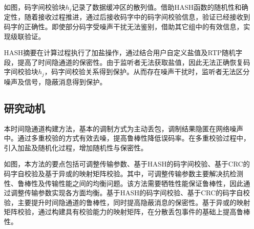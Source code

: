 如图，码字间校验块$h_{j}$记录了数据缓冲区的散列值。借助HASH函数的随机性和确定性，随着接收过程推进，通过后接收码字中的码字间校验信息，验证已经接收到码字的正确性。即使部分码字受噪声干扰无法鉴别，借助其它组中的有效信息，实现级联验证。

HASH摘要在计算过程执行了加盐操作，通过结合用户自定义盐值及RTP随机字段，提高了时间隐通道的保密性。由于监听者无法获取盐值，因此无法正确恢复码字间校验块$h_{j}$，码字间校验关系得到保护。从而存在噪声干扰时，监听者无法区分噪声及信号，隐蔽消息得到保护。

\subsection{研究动机}
\label{chap:hash:motivation:motivation}

本时间隐通道构建方法，基本的调制方式为主动丢包，调制结果隐匿在网络噪声中。通过多重校验的方式有效去噪，提高鲁棒性降低误码率。在多重校验过程中，引入加盐及随机化过程，增加随机性与保密性。


如图，本方法的要点包括可调整传输参数、基于HASH的码字间校验、基于CRC的码字自校验及基于异或的映射矩阵校验。其中，可调整传输参数主要解决抗检测性、鲁棒性及传输性能之间的均衡问题。该方法需要牺牲性能保证鲁棒性，因此通过调整传输参数实现各方面均衡。基于HASH的码字间校验、基于CRC的码字自校验，主要提升时间隐通道的鲁棒性，同时提高隐蔽消息的保密性。基于异或的映射矩阵校验，通过构建具有校验能力的映射矩阵，在分散丢包事件的基础上提高鲁棒性。